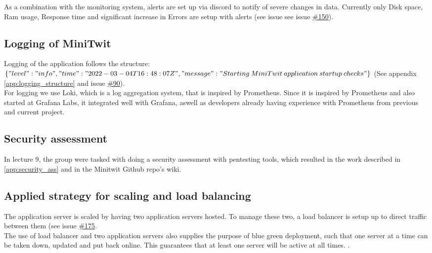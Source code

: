 As a combination with the monitoring system, alerts are set up via discord to notify of severe changes in data. Currently only Disk space, Ram usage, Response time and significant increase in Errors are setup with alerts (see issue see issue \href{https://github.com/DevelOpsITU/MiniTwit/issues/150}{\#150}).


\subsection{Logging of MiniTwit}
Logging of the application follows the structure: \\
$\{"level":"info","time":"2022-03-04T16:48:07Z",\\"message":"Starting\: MiniTwit\: application\: startup\: checks"\}$ (See appendix \ref{app:logging_structure} and issue \href{https://github.com/DevelOpsITU/MiniTwit/issues/90}{\#90}).\\

For logging we use Loki, which is a log aggregation system, that is inspired by Prometheus\cite{grafana_loki}\cite{grafana_loki_docs}. Since it is inspired by Prometheus and also started at Grafana Labs, it integrated well with Grafana, aswell as developers already having experience with Prometheus from previous and current project. 

\subsection{Security assessment}
In lecture 9, the group were tasked with doing a security assessment with pentesting tools, which resulted in the work described in \autoref{app:security_ass} and in the Minitwit Github repo's wiki.\cite{github_wiki_security} 


\subsection{Applied strategy for scaling and load balancing}
The application server is scaled by having two application servers hosted. To manage these two, a load balancer is setup up to direct traffic between them (see issue \href{https://github.com/DevelOpsITU/MiniTwit/issues/175}{\#175}. \\
The use of load balancer and two application servers also supplies the purpose of blue green deployment, such that one server at a time can be taken down, updated and put back online. This guarantees that at least one server will be active at all times.  \cite{blue_green_deployment}.

